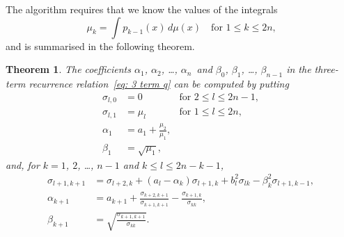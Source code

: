 \documentclass[12pt,a4paper]{article}
\newtheorem{theorem}{Theorem}
\begin{document}
The algorithm requires that we know the values of the integrals
\[
\mu_k=\int p_{k-1}(x)\,d\mu(x)\quad\text{for $1\le k\le 2n$,}
\]
and is summarised in the following theorem.

\begin{theorem}
The coefficients $\alpha_1$, $\alpha_2$, \dots, $\alpha_n$~and 
$\beta_0$, $\beta_1$, \dots, $\beta_{n-1}$ in the three-term 
recurrence relation~\eqref{eq: 3 term q} can be computed by putting
\[
\begin{aligned}
\sigma_{l,0}&=0&\text{for $2\le l\le 2n-1$},\\
\sigma_{l,1}&=\mu_l&\text{for $1\le l\le2n$},\\
\alpha_1&=a_1+\frac{\mu_2}{\mu_1},\\
\beta_1&=\sqrt{\mu_1},
\end{aligned} 
\]
and, for $k=1$, $2$, \dots, $n-1$ and $k\le l\le2n-k-1$, 
\[
\begin{aligned}
\sigma_{l+1,k+1}&=\sigma_{l+2,k}+(a_l-\alpha_k)\sigma_{l+1,k}
		+b_l^2\sigma_{lk}-\beta_k^2\sigma_{l+1,k-1},\\
\alpha_{k+1}&=a_{k+1}+\frac{\sigma_{k+2,k+1}}{\sigma_{k+1,k+1}}
	-\frac{\sigma_{k+1,k}}{\sigma_{kk}},\\
\beta_{k+1}&=\sqrt{\frac{\sigma_{k+1,k+1}}{\sigma_{kk}}}.
\end{aligned}
\]
\end{theorem}
\end{document}
